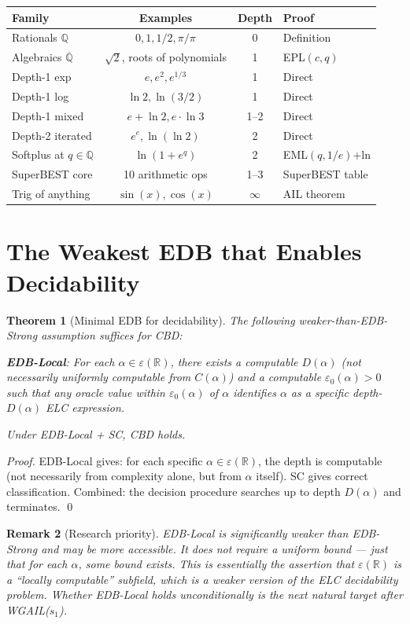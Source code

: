 \documentclass[11pt]{article}
\newtheorem{theorem}{Theorem}
\newtheorem{remark}[theorem]{Remark}
\begin{document}
\begin{center}
\renewcommand{\arraystretch}{1.2}
\begin{tabular}{lccl}
\toprule
Family & Examples & Depth & Proof \\
\midrule
Rationals $\mathbb{Q}$ & $0, 1, 1/2, \pi/\pi$ & 0 & Definition \\
Algebraics $\overline{\mathbb{Q}}$ & $\sqrt{2}$, roots of polynomials & 1 & EPL$(c,q)$ \\
Depth-1 exp & $e, e^2, e^{1/3}$ & 1 & Direct \\
Depth-1 log & $\ln 2, \ln(3/2)$ & 1 & Direct \\
Depth-1 mixed & $e + \ln 2, e \cdot \ln 3$ & 1--2 & Direct \\
Depth-2 iterated & $e^e, \ln(\ln 2)$ & 2 & Direct \\
Softplus at $q \in \mathbb{Q}$ & $\ln(1+e^q)$ & 2 & EML$(q,1/e)$+ln \\
SuperBEST core & 10 arithmetic ops & 1--3 & SuperBEST table \\
Trig of anything & $\sin(x), \cos(x)$ & $\infty$ & AIL theorem \\
\bottomrule
\end{tabular}
\end{center}

\section{The Weakest EDB that Enables Decidability}

\begin{theorem}[Minimal EDB for decidability]
\label{thm:min_edb}
The following weaker-than-EDB-Strong assumption suffices for CBD:

\textbf{EDB-Local}: For each $\alpha \in \varepsilon(\mathbb{R})$,
there exists a computable $D(\alpha)$ (not necessarily uniformly computable
from $C(\alpha)$) and a computable $\varepsilon_0(\alpha) > 0$ such that
any oracle value within $\varepsilon_0(\alpha)$ of $\alpha$ identifies $\alpha$
as a specific depth-$D(\alpha)$ ELC expression.

Under EDB-Local + SC, CBD holds.
\end{theorem}

\begin{proof}
EDB-Local gives: for each specific $\alpha \in \varepsilon(\mathbb{R})$, the
depth is computable (not necessarily from complexity alone, but from $\alpha$ itself).
SC gives correct classification.
Combined: the decision procedure searches up to depth $D(\alpha)$ and terminates. \qed
\end{proof}

\begin{remark}[Research priority]
EDB-Local is significantly weaker than EDB-Strong and may be more accessible.
It does not require a uniform bound — just that for each $\alpha$, some bound exists.
This is essentially the assertion that $\varepsilon(\mathbb{R})$ is a ``locally computable''
subfield, which is a weaker version of the ELC decidability problem.
Whether EDB-Local holds unconditionally is the next natural target after WGAIL($s_1$).
\end{remark}
\end{document}
